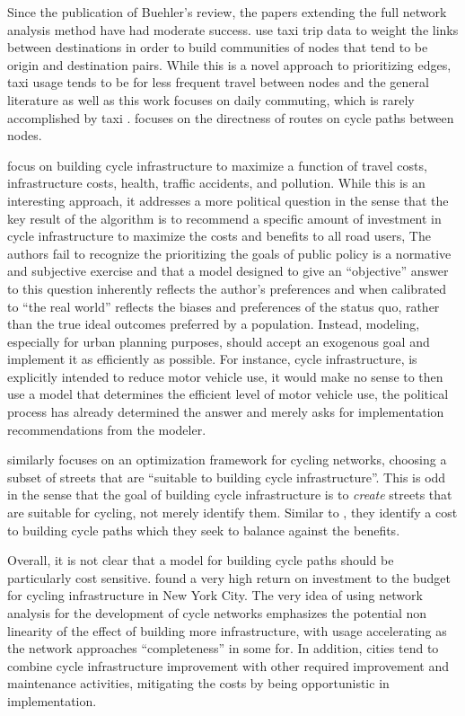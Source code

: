 Since the publication of Buehler's review, the papers extending the full network analysis method have had moderate success. \textcite{akbarzadeh2018designing} use taxi trip data to weight the links between destinations in order to build communities of nodes that tend to be origin and destination pairs. While this is a novel approach to prioritizing edges, taxi usage tends to be for less frequent travel between nodes and the general literature as well as this work focuses on daily commuting, which is rarely accomplished by taxi \parencite{jtw}. \textcite{boisjoly2019bicycle} focuses on the directness of routes on cycle paths between nodes. 

\textcite{doorley2019designing} focus on building cycle infrastructure to maximize a function of travel costs, infrastructure costs, health, traffic accidents, and pollution. While this is an interesting approach, it addresses a more political question in the sense that the key result of the algorithm is to recommend a specific amount of investment in cycle infrastructure to maximize the costs and benefits to all road users, The authors fail to recognize the prioritizing the goals of public policy is a normative and subjective exercise and that a model designed to give an ``objective'' answer to this question inherently reflects the author's preferences and when calibrated to ``the real world'' reflects the biases and preferences of the status quo, rather than the true ideal outcomes preferred by a population. Instead, modeling, especially for urban planning purposes, should accept an exogenous goal and implement it as efficiently as possible. For instance, cycle infrastructure, is explicitly intended to reduce motor vehicle use, it would make no sense to then use a model that determines the efficient level of motor vehicle use, the political process has already determined the answer and merely asks for implementation recommendations from the modeler. 

\textcite{mauttone2017bicycle} similarly focuses on an optimization framework for cycling networks, choosing a subset of streets that are ``suitable to building cycle infrastructure''. This is odd in the sense that the goal of building cycle infrastructure is to \textit{create} streets that are suitable for cycling, not merely identify them. Similar to \textcite{doorley2019designing}, they identify a cost to building cycle paths which they seek to balance against the benefits. 

Overall, it is not clear that a model for building cycle paths should be particularly cost sensitive. \textcite{gu2017cost} found a very high return on investment to the budget for cycling infrastructure in New York City. The very idea of using network analysis for the development of cycle networks emphasizes the potential non linearity of the effect of building more infrastructure, with usage accelerating as the network approaches ``completeness'' in some for. In addition, cities tend to combine cycle infrastructure improvement with other required improvement and maintenance activities, mitigating the costs by being opportunistic in implementation. 

